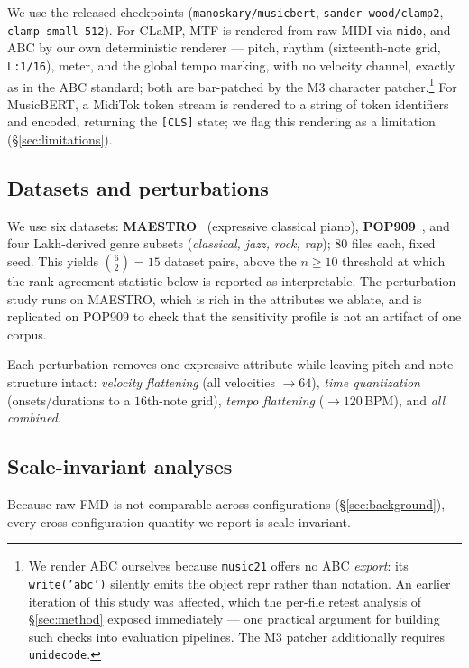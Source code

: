 \documentclass[11pt]{article}
\begin{document}
We use the released checkpoints (\texttt{manoskary/musicbert},
\texttt{sander-wood/clamp2}, \texttt{clamp-small-512}). For CLaMP, MTF is
rendered from raw MIDI via \texttt{mido}, and ABC by our own deterministic
renderer --- pitch, rhythm (sixteenth-note grid, \texttt{L:1/16}), meter,
and the global tempo marking, with no velocity channel, exactly as in the
ABC standard; both are bar-patched by the M3 character
patcher.\footnote{We render ABC ourselves because \texttt{music21} offers
no ABC \emph{export}: its \texttt{write('abc')} silently emits the object
repr rather than notation. An earlier iteration of this study was affected,
which the per-file retest analysis of \S\ref{sec:method} exposed
immediately --- one practical argument for building such checks into
evaluation pipelines. The M3 patcher additionally requires
\texttt{unidecode}.} For MusicBERT, a MidiTok token stream is rendered to a
string of token identifiers and encoded, returning the \texttt{[CLS]}
state; we flag this rendering as a limitation (\S\ref{sec:limitations}).

\subsection{Datasets and perturbations}
We use six datasets: \textbf{MAESTRO}~\cite{hawthorne2019maestro}
(expressive classical piano), \textbf{POP909}~\cite{wang2020pop909}, and
four Lakh-derived genre subsets (\emph{classical, jazz, rock, rap}); $80$
files each, fixed seed. This yields $\binom{6}{2}=15$ dataset pairs, above
the $n\ge 10$ threshold at which the rank-agreement statistic below is
reported as interpretable. The perturbation study runs on MAESTRO, which is
rich in the attributes we ablate, and is replicated on POP909 to check that
the sensitivity profile is not an artifact of one corpus.

Each perturbation removes one expressive attribute while leaving pitch and
note structure intact: \emph{velocity flattening} (all velocities $\to64$),
\emph{time quantization} (onsets/durations to a $16$th-note grid),
\emph{tempo flattening} ($\to120$\,BPM), and \emph{all combined}.

\subsection{Scale-invariant analyses}
Because raw FMD is not comparable across configurations
(\S\ref{sec:background}), every cross-configuration quantity we report is
scale-invariant.
\end{document}
